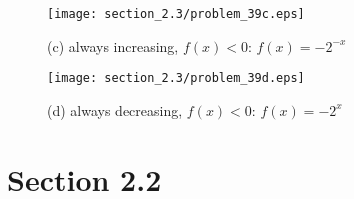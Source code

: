 \documentclass{exam}
\begin{document}
\begin{description}
      \begin{figure}[H]
        \centering
        \texttt{[image: section\_2.3/problem\_39c.eps]}
        \caption*{(c) always increasing, $f(x) < 0$: $f(x) = -2^{-x}$}
      \end{figure}

      \begin{figure}[H]
        \centering
        \texttt{[image: section\_2.3/problem\_39d.eps]}
        \caption*{(d) always decreasing, $f(x) < 0$: $f(x) = -2^x$}
      \end{figure}

  \end{description}

  \pagebreak

  \section{Section 2.2}
\end{document}
